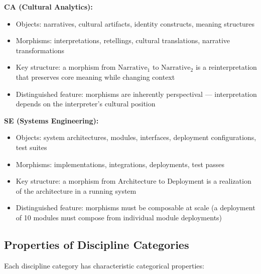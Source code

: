 \documentclass[11pt,a4paper]{article}
\begin{document}
\textbf{CA (Cultural Analytics):}
\begin{itemize}
    \item Objects: narratives, cultural artifacts, identity constructs, meaning structures
    \item Morphisms: interpretations, retellings, cultural translations, narrative transformations
    \item Key structure: a morphism from $\mathrm{Narrative}_1$ to $\mathrm{Narrative}_2$ is a reinterpretation that preserves core meaning while changing context
    \item Distinguished feature: morphisms are inherently perspectival --- interpretation depends on the interpreter's cultural position
\end{itemize}

\textbf{SE (Systems Engineering):}
\begin{itemize}
    \item Objects: system architectures, modules, interfaces, deployment configurations, test suites
    \item Morphisms: implementations, integrations, deployments, test passes
    \item Key structure: a morphism from Architecture to Deployment is a realization of the architecture in a running system
    \item Distinguished feature: morphisms must be composable at scale (a deployment of 10 modules must compose from individual module deployments)
\end{itemize}

\subsection{Properties of Discipline Categories}

Each discipline category has characteristic categorical properties:
\end{document}
